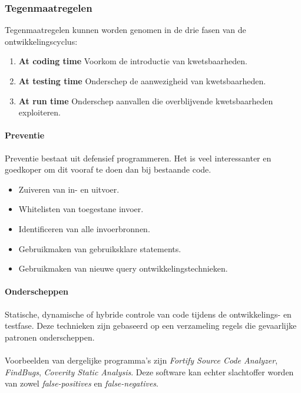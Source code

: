 \documentclass[../main.tex]{subfiles}
\begin{document}
\subsubsection{Tegenmaatregelen}
Tegenmaatregelen kunnen worden genomen in de drie fasen van de ontwikkelingscyclus:
\begin{enumerate}
	\item \textbf{At coding time} Voorkom de introductie van kwetsbaarheden.
	\item \textbf{At testing time} Onderschep de aanwezigheid van kwetsbaarheden.
	\item \textbf{At run time} Onderschep aanvallen die overblijvende kwetsbaarheden exploiteren.
\end{enumerate}

\paragraph{Preventie} Preventie bestaat uit defensief programmeren. Het is veel interessanter en goedkoper om dit vooraf te doen dan bij bestaande code.
\begin{itemize}
	\item Zuiveren van in- en uitvoer.
	\item Whitelisten van toegestane invoer.
	\item Identificeren van alle invoerbronnen.
	\item Gebruikmaken van gebruiksklare statements.
	\item Gebruikmaken van nieuwe query ontwikkelingstechnieken.
\end{itemize}

\paragraph{Onderscheppen} Statische, dynamische of hybride controle van code tijdens de ontwikkelings- en testfase. Deze technieken zijn gebaseerd op een verzameling regels die gevaarlijke patronen onderscheppen.
\\\\
Voorbeelden van dergelijke programma's zijn \textit{Fortify Source Code Analyzer}, \textit{FindBugs}, \textit{Coverity Static Analysis}. Deze software kan echter slachtoffer worden van zowel \textit{false-positives} en \textit{false-negatives}.
\end{document}
